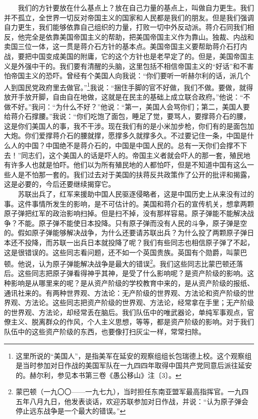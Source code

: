 \documentclass[cn,11pt,chinese]{elegantbook}
\begin{document}
　　我们的方针要放在什么基点上？放在自己力量的基点上，叫做自力更生。我们并不孤立，全世界一切反对帝国主义的国家和人民都是我们的朋友。但是我们强调自力更生，我们能够依靠自己组织的力量，打败一切中外反动派。蒋介石同我们相反，他完全是依靠美国帝国主义的帮助，把美国帝国主义作为靠山。独裁、内战和卖国三位一体，这一贯是蒋介石方针的基本点。美国帝国主义要帮助蒋介石打内战，要把中国变成美国的附庸，它的这个方针也是老早定了的。但是，美国帝国主义是外强中干的。我们要有清醒的头脑，这里包括不相信帝国主义的“好话”和不害怕帝国主义的恐吓。曾经有个美国人向我说：“你们要听一听赫尔利的话，派几个人到国民党政府里去做官。”\footnote[16]{ 这里所说的“美国人”，是指美军在延安的观察组组长包瑞德上校。这个观察组是当时参加对日作战的美国军队在一九四四年取得中国共产党同意后派往延安的。赫尔利，参见本书第三卷《愚公移山》注〔3〕。}我说：“捆住手脚的官不好做，我们不做。要做，就得放开手放开脚，自由自在地做，这就是在民主的基础上成立联合政府。”他说：“不做不好。”我问：“为什么不好？”他说：“第一，美国人会骂你们；第二，美国人要给蒋介石撑腰。”我说：“你们吃饱了面包，睡足了觉，要骂人，要撑蒋介石的腰，这是你们美国人的事，我不干涉。现在我们有的是小米加步枪，你们有的是面包加大炮。你们爱撑蒋介石的腰就撑，愿撑多久就撑多久。不过要记住一条，中国是什么人的中国？中国绝不是蒋介石的，中国是中国人民的。总有一天你们会撑不下去！”同志们，这个美国人的话是吓人的。帝国主义者就会吓人的那一套，殖民地有许多人也就是怕吓。他们以为所有殖民地的人都怕吓，但是不知道中国有这么一些人是不怕那一套的。我们过去对于美国的扶蒋反共政策作了公开的批评和揭露，这是必要的，今后还要继续揭穿它。\\
　　苏联出兵了，红军来援助中国人民驱逐侵略者，这是中国历史上从来没有过的事。这件事情所发生的影响，是不可估计的。美国和蒋介石的宣传机关，想拿两颗原子弹把红军的政治影响扫掉。但是扫不掉，没有那样容易。原子弹能不能解决战争？不能。原子弹不能使日本投降。只有原子弹而没有人民的斗争，原子弹是空的。假如原子弹能够解决战争，为什么还要请苏联出兵？为什么投了两颗原子弹日本还不投降，而苏联一出兵日本就投降了呢？我们有些同志也相信原子弹了不起，这是很错误的。这些同志看问题，还不如一个英国贵族。英国有个勋爵，叫蒙巴顿。他说，认为原子弹能解决战争是最大的错误\footnote[17]{ 蒙巴顿（一九〇〇——一九七九），当时担任东南亚盟军最高指挥官。一九四五年八月九日，他发表谈话，欢迎苏联参加对日作战，并说：“认为原子弹会停止远东战争是一个最大的错误。”}。我们这些同志比蒙巴顿还落后。这些同志把原子弹看得神乎其神，是受了什么影响呢？是资产阶级的影响。这种影响是从哪里来的呢？是从资产阶级的学校教育中来的，是从资产阶级的报纸、通讯社来的。有两种世界观、方法论：无产阶级的世界观、方法论和资产阶级的世界观、方法论。这些同志把资产阶级的世界观、方法论，经常拿在手里；无产阶级的世界观、方法论，却经常丢在脑后。我们队伍中的唯武器论，单纯军事观点，官僚主义、脱离群众的作风，个人主义思想，等等，都是资产阶级的影响。对于我们队伍中的这些资产阶级的东西，也要像打扫灰尘一样，常常扫除。\\
\end{document}
